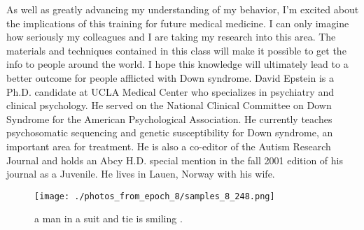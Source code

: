 \documentclass{article}%
\begin{document}
As well as greatly advancing my understanding of my behavior, I’m excited about the implications of this training for future medical medicine.\newline%
I can only imagine how seriously my colleagues and I are taking my research into this area. The materials and techniques contained in this class will make it possible to get the info to people around the world. I hope this knowledge will ultimately lead to a better outcome for people afflicted with Down syndrome.\newline%
David Epstein is a Ph.D. candidate at UCLA Medical Center who specializes in psychiatry and clinical psychology. He served on the National Clinical Committee on Down Syndrome for the American Psychological Association. He currently teaches psychosomatic sequencing and genetic susceptibility for Down syndrome, an important area for treatment. He is also a co{-}editor of the Autism Research Journal and holds an Abcy H.D. special mention in the fall 2001 edition of his journal as a Juvenile. He lives in Lauen, Norway with his wife.\newline%

%


\begin{figure}[h!]%
\centering%
\texttt{[image: ./photos\_from\_epoch\_8/samples\_8\_248.png]}%
\caption{a man in a suit and tie is smiling .}%
\end{figure}

%
\end{document}
